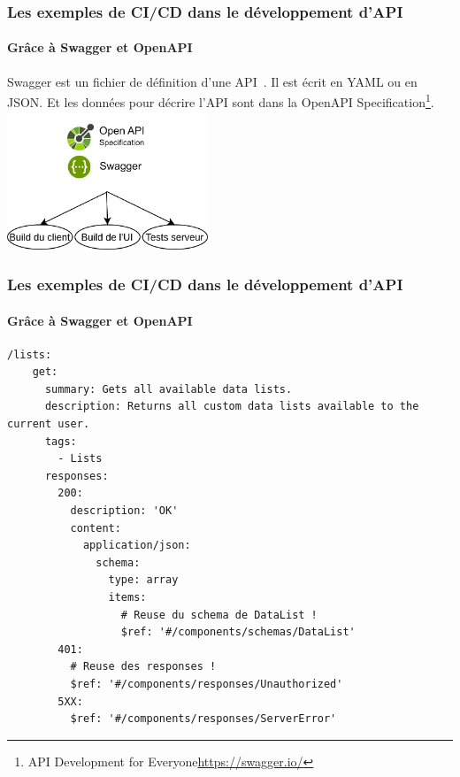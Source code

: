 \documentclass{beamer}
\begin{document}
    \begin{frame}
        \frametitle{Les exemples de CI/CD dans le développement d'API}
        \framesubtitle{Grâce à Swagger et OpenAPI}
        \transdissolve
        Swagger est un fichier de définition d'une API~.
        Il est écrit en YAML ou en JSON. Et les données pour décrire l'API sont dans la OpenAPI Specification\footnote{API Development for Everyone\url{https://swagger.io/}}.
        \break
        \centering
        \includegraphics[width=6cm]{image/swagger-capacity.drawio.png}
    \end{frame}

    \begin{frame}[fragile]
        \frametitle{Les exemples de CI/CD dans le développement d'API}
        \framesubtitle{Grâce à Swagger et OpenAPI}
        \transdissolve
        \begin{lstlisting}
/lists:
    get:
      summary: Gets all available data lists.
      description: Returns all custom data lists available to the current user.
      tags:
        - Lists
      responses:
        200:
          description: 'OK'
          content:
            application/json:
              schema:
                type: array
                items:
                  # Reuse du schema de DataList !
                  $ref: '#/components/schemas/DataList'
        401:
          # Reuse des responses !
          $ref: '#/components/responses/Unauthorized'
        5XX:
          $ref: '#/components/responses/ServerError'
        \end{lstlisting}
    \end{frame}
\end{document}
